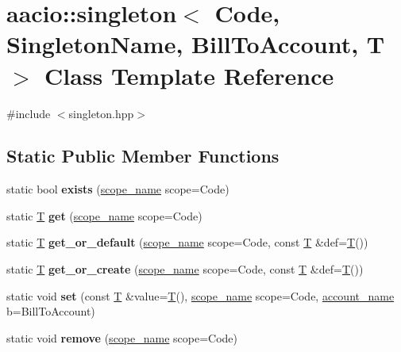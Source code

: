\hypertarget{classaacio_1_1singleton}{}\section{aacio\+:\+:singleton$<$ Code, Singleton\+Name, Bill\+To\+Account, T $>$ Class Template Reference}
\label{classaacio_1_1singleton}


{\ttfamily \#include $<$singleton.\+hpp$>$}

\subsection*{Static Public Member Functions}
\begin{DoxyCompactItemize}
\item 
\mbox{\label{classaacio_1_1singleton_a1d9536650b40365f517417a68e7a389d}} 
static bool {\bfseries exists} (\mbox{\hyperlink{structaacio_1_1chain_1_1name}{scope\+\_\+name}} scope=Code)
\item 
\mbox{\label{classaacio_1_1singleton_a2b58c14bc3e2bcf3b5c00bf2cd89e6ad}} 
static \mbox{\hyperlink{struct_t}{T}} {\bfseries get} (\mbox{\hyperlink{structaacio_1_1chain_1_1name}{scope\+\_\+name}} scope=Code)
\item 
\mbox{\label{classaacio_1_1singleton_a5e8c757400c3b27d60825cbe5c6824e6}} 
static \mbox{\hyperlink{struct_t}{T}} {\bfseries get\+\_\+or\+\_\+default} (\mbox{\hyperlink{structaacio_1_1chain_1_1name}{scope\+\_\+name}} scope=Code, const \mbox{\hyperlink{struct_t}{T}} \&def=\mbox{\hyperlink{struct_t}{T}}())
\item 
\mbox{\label{classaacio_1_1singleton_ac00a252a378cd59784ff7978b9d774f9}} 
static \mbox{\hyperlink{struct_t}{T}} {\bfseries get\+\_\+or\+\_\+create} (\mbox{\hyperlink{structaacio_1_1chain_1_1name}{scope\+\_\+name}} scope=Code, const \mbox{\hyperlink{struct_t}{T}} \&def=\mbox{\hyperlink{struct_t}{T}}())
\item 
\mbox{\label{classaacio_1_1singleton_a2bcbede81300b61b0105e8d975f5c884}} 
static void {\bfseries set} (const \mbox{\hyperlink{struct_t}{T}} \&value=\mbox{\hyperlink{struct_t}{T}}(), \mbox{\hyperlink{structaacio_1_1chain_1_1name}{scope\+\_\+name}} scope=Code, \mbox{\hyperlink{structaacio_1_1chain_1_1name}{account\+\_\+name}} b=Bill\+To\+Account)
\item 
\mbox{\label{classaacio_1_1singleton_af2e61a518abd35d96ab30b635432c057}} 
static void {\bfseries remove} (\mbox{\hyperlink{structaacio_1_1chain_1_1name}{scope\+\_\+name}} scope=Code)
\end{DoxyCompactItemize}


